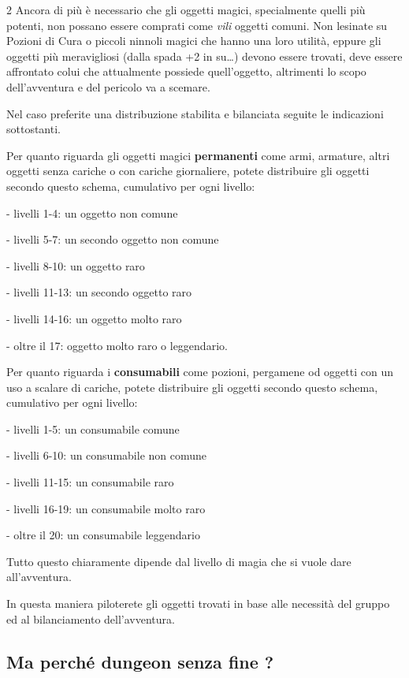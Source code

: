 \begin{multicols}{2}
Ancora di più è necessario che gli oggetti magici, specialmente quelli più potenti, non possano essere comprati come \emph{vili} oggetti comuni. Non lesinate su Pozioni di Cura o piccoli ninnoli magici che hanno una loro utilità, eppure gli oggetti più meravigliosi (dalla spada +2 in su…) devono essere trovati, deve essere affrontato colui che attualmente possiede quell'oggetto, altrimenti lo scopo dell'avventura e del pericolo va a scemare.

Nel caso preferite una distribuzione stabilita e bilanciata seguite le indicazioni sottostanti.

Per quanto riguarda gli oggetti magici \textbf{permanenti} come armi, armature, altri oggetti senza cariche o con cariche giornaliere, potete distribuire gli oggetti secondo questo schema, cumulativo per ogni livello:

\medskip

- livelli 1-4: un oggetto non comune

- livelli 5-7: un secondo oggetto non comune

- livelli 8-10: un oggetto raro

- livelli 11-13: un secondo oggetto raro

- livelli 14-16: un oggetto molto raro

- oltre il 17: oggetto molto raro o leggendario.

\medskip

Per quanto riguarda i \textbf{consumabili} come pozioni, pergamene od oggetti con un uso a scalare di cariche, potete distribuire gli oggetti secondo questo schema, cumulativo per ogni livello:

\medskip

- livelli 1-5: un consumabile comune

- livelli 6-10: un consumabile non comune

- livelli 11-15: un consumabile raro

- livelli 16-19: un consumabile molto raro

- oltre il 20: un consumabile leggendario

\medskip

Tutto questo chiaramente dipende dal livello di magia che si vuole dare all'avventura.

In questa maniera piloterete gli oggetti trovati in base alle necessità del gruppo ed al bilanciamento dell'avventura.

\subsection*{Ma perché dungeon senza fine ?}


\end{multicols}
